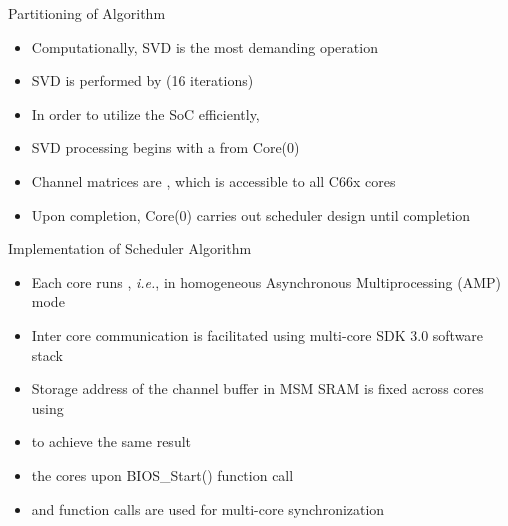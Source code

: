 \documentclass[11pt]{beamer}
\begin{document}
\begin{frame}{Partitioning of Algorithm}
	\begin{itemize}
		\item Computationally, SVD is the most demanding operation
		\item SVD is performed by  (16 iterations)
		\item In order to utilize the SoC efficiently, 
		\item SVD processing begins with a  from Core(0)
		\item Channel matrices are , which is accessible to all C66x cores
		\item Upon completion, Core(0) carries out scheduler design until completion
	\end{itemize}
\end{frame}

\begin{frame}{Implementation of Scheduler Algorithm}
	\begin{itemize}
		\item Each core runs , \textit{i.e.}, in homogeneous Asynchronous Multiprocessing (AMP) mode
		\item Inter core communication is facilitated using multi-core SDK 3.0 software stack
		\item Storage address of the channel buffer in MSM SRAM is fixed across cores using 
		\item {} to achieve the same result
		\item {} the cores upon {BIOS\_Start()} function call
		\item {} and  function calls are used for multi-core synchronization
	\end{itemize}
\end{frame}
\end{document}
